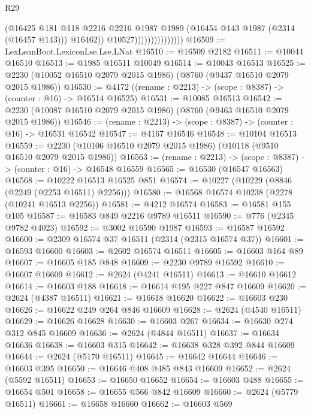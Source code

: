 \begin{lexlean}{R29}
\begin{coremodule}
                                    (@16425
                                      @181
                                      @118
                                      @2216
                                      @2216
                                      @1987
                                      @1989
                                      (@16454 @143 @1987 (@2314 (@16457 @143)))
                                      @16462))
                                  @10527)))))))))))))))
@16509 := LexLeanBoot.LexiconLse.Lse.LNat
@16510 := @16509 @2182
@16511 := @10044 @16510
@16513 := @1985 @16511 @10049
@16514 := @10043 @16513
@16525 := @2230 (@10052 @16510 @2079 @2015 @1986) (@8760 (@9437 @16510 @2079 @2015 @1986))
@16530 := @4172 ((rename : @2213) -> (scope : @8387) -> (counter : @16) -> @16514 @16525)
@16531 := @10085 @16513
@16542 := @2230 (@10087 @16510 @2079 @2015 @1986) (@8760 (@9463 @16510 @2079 @2015 @1986))
@16546 := (rename : @2213) -> (scope : @8387) -> (counter : @16) -> @16531 @16542
@16547 := @4167 @16546
@16548 := @10104 @16513
@16559 := @2230 (@10106 @16510 @2079 @2015 @1986) (@10118 (@9510 @16510 @2079 @2015 @1986))
@16563 := (rename : @2213) -> (scope : @8387) -> (counter : @16) -> @16548 @16559
@16565 := @16530 (@16547 @16563)
@16568 := @10222 @16513 @16525 @851
@16574 := @10227 (@10229 (@8846 (@2249 (@2253 @16511) @2256)))
@16580 := @16568 @16574 @10238 (@2278 (@10241 @16513 @2256))
@16581 := @4212 @16574
@16583 := @16581 @155 @105
@16587 := @16583 @849 @2216 @9789 @16511
@16590 := @776 (@2345 @9782 @4023)
@16592 := @3002 @16590 @1987
@16593 := @16587 @16592
@16600 := @2309 @16574 @37 @16511 (@2314 (@2315 @16574 @37))
@16601 := @16593 @16600
@16603 := @2602 @16574 @16511
@16605 := @16603 @164 @89
@16607 := @16605 @185 @848
@16609 := @2230 @9789 @16592
@16610 := @16607 @16609
@16612 := @2624 (@4241 @16511)
@16613 := @16610 @16612
@16614 := @16603 @188
@16618 := @16614 @195 @227 @847 @16609
@16620 := @2624 (@4387 @16511)
@16621 := @16618 @16620
@16622 := @16603 @230
@16626 := @16622 @249 @264 @846 @16609
@16628 := @2624 (@4540 @16511)
@16629 := @16626 @16628
@16630 := @16603 @267
@16634 := @16630 @274 @312 @845 @16609
@16636 := @2624 (@4844 @16511)
@16637 := @16634 @16636
@16638 := @16603 @315
@16642 := @16638 @328 @392 @844 @16609
@16644 := @2624 (@5170 @16511)
@16645 := @16642 @16644
@16646 := @16603 @395
@16650 := @16646 @408 @485 @843 @16609
@16652 := @2624 (@5592 @16511)
@16653 := @16650 @16652
@16654 := @16603 @488
@16655 := @16654 @501
@16658 := @16655 @566 @842 @16609
@16660 := @2624 (@5779 @16511)
@16661 := @16658 @16660
@16662 := @16603 @569

\end{coremodule}
\end{lexlean}
